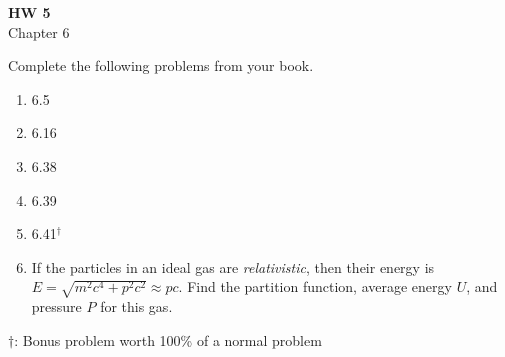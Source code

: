 \documentclass{article}
\begin{document}
\fancyfoot[C]{\thepage}
\vspace*{0cm}
\begin{center}
	{\LARGE \textbf{HW 5}}\\
	\vspace{.25cm}
	{\Large Chapter 6}
\end{center}

Complete the following problems from your book.

\begin{enumerate}
	\item 6.5
	\item 6.16
	\item 6.38
	\item 6.39
	\item 6.41$^\dagger$
	\item If the particles in an ideal gas are \textit{relativistic}, then their energy is $E=\sqrt{m^2c^4+p^2c^2}\approx pc$. Find the partition function, average energy $U$, and pressure $P$ for this gas.
	
\end{enumerate}
$\dagger$: Bonus problem worth 100\% of a normal problem
\end{document}
